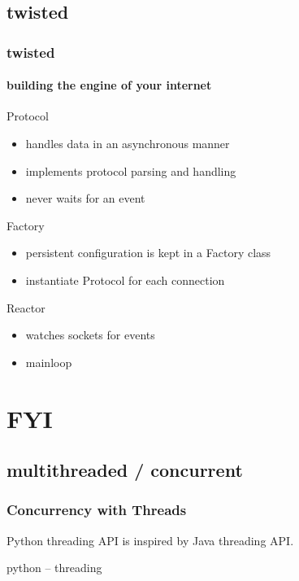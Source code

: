 \documentclass{beamer}
\begin{document}
\subsection*{twisted}	%
\begin{frame}[fragile]
	\frametitle{twisted}
	\framesubtitle{building the engine of your internet}
	\begin{block}{Protocol}
	\begin{itemize}
		\item handles data in an asynchronous manner
		\item implements protocol parsing and handling
		\item never waits for an event
	\end{itemize}
	\end{block}

	\begin{block}{Factory}
	\begin{itemize}
		\item persistent configuration is kept in a Factory class
		\item instantiate Protocol for each connection
	\end{itemize}
	\end{block}

	\begin{block}{Reactor}
	\begin{itemize}
		\item watches sockets for events
		\item mainloop
	\end{itemize}
	\end{block}
\end{frame}

\section{FYI}

\subsection*{multithreaded / concurrent}

\begin{frame}[fragile]
	\frametitle{Concurrency with Threads}
	Python threading API is inspired by Java threading API.
	\begin{exampleblock}{python -- threading}
	\begin{lstlisting}
	
	\end{lstlisting}
	\end{exampleblock}
\end{frame}
\end{document}
